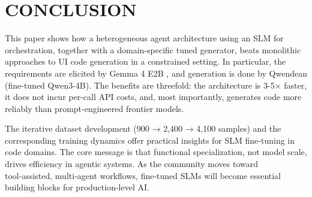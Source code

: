 \documentclass[conference]{IEEEtran}
\begin{document}
\section{CONCLUSION}

This paper shows how a heterogeneous agent architecture using an SLM for orchestration, together with a domain-specific tuned generator, beats monolithic approaches to UI code generation in a constrained setting. In particular, the requirements are elicited by Gemma 4 E2B , and generation is done by Qwendean (fine-tuned Qwen3-4B). The benefits are threefold: the architecture is 3-5× faster, it does not incur per-call API costs, and, most importantly, generates code more reliably than prompt-engineered frontier models.

The iterative dataset development (900 → 2,400 → 4,100 samples) and the corresponding training dynamics offer practical insights for SLM fine‑tuning in code domains. The core message is that functional specialization, not model scale, drives efficiency in agentic systems. As the community moves toward tool‑assisted, multi‑agent workflows, fine‑tuned SLMs will become essential building blocks for production‑level AI.
\end{document}
